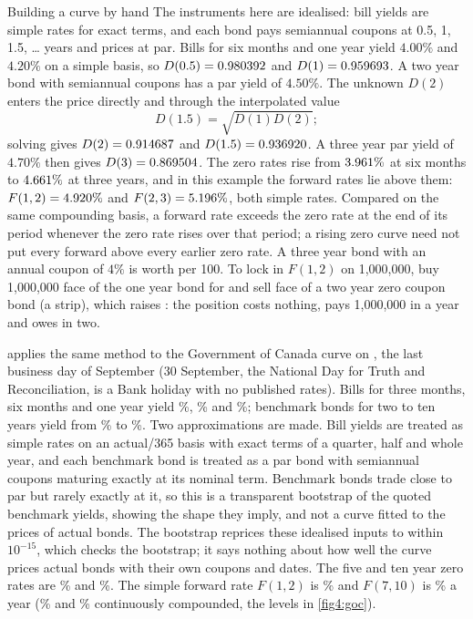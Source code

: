 \begin{chapterrefs}
\begin{example}{Building a curve by hand}\label{ex4:boot}
The instruments here are idealised: bill yields are simple rates for exact terms, and each bond pays
semiannual coupons at 0.5, 1, 1.5, \ldots{} years and prices at par. Bills for six months and one year yield $4.00\%$ and $4.20\%$ on a simple basis, so $D(0.5)=0.980392$
and $D(1)=0.959693$. A two year bond with semiannual coupons has a par yield of $4.50\%$. The unknown
$D(2)$ enters the price directly and through the interpolated value
\[
  D(1.5)=\sqrt{D(1)D(2)};
\]
solving gives
$D(2)=0.914687$ and $D(1.5)=0.936920$. A three year par yield of $4.70\%$ then gives
$D(3)=0.869504$. The zero rates rise from $3.961\%$ at six months to $4.661\%$ at three
years, and in this example the forward rates lie above them: $F(1,2)=4.920\%$ and
$F(2,3)=5.196\%$, both simple rates. Compared on the same compounding basis, a forward rate
exceeds the zero rate at the end of its period whenever the zero rate rises over that period; a rising
zero curve need not put every forward above every earlier zero rate. A three year bond with an annual coupon of
$4\%$ is worth \hxBondFour{} per 100. To lock in $F(1,2)$ on 1,000,000, buy 1,000,000 face of the
one year bond for \fraBuy{} and sell \fraRepay{} face of a two year zero coupon bond (a strip), which raises \fraSell:
the position costs nothing, pays 1,000,000 in a year and owes \fraRepay{} in two.
\end{example}

 applies the same method to the Government of Canada curve on \gocDate, the last
business day of September (30 September, the National Day for Truth and Reconciliation, is a Bank
holiday with no published rates). Bills for three
months, six months and one year yield \gocThreeM\%, \gocSixM\% and \gocOneY\%; benchmark bonds for two
to ten years yield from \gocTwoY\% to \gocTenY\%. Two approximations are made. Bill yields are treated
as simple rates on an actual/365 basis with exact terms of a quarter, half and whole year, and each
benchmark bond is treated as a par bond with semiannual coupons maturing exactly at its nominal term.
Benchmark bonds trade close to par but rarely exactly at it, so this is a transparent bootstrap of
the quoted benchmark yields, showing the shape they imply, and not a curve fitted to the prices of
actual bonds. The bootstrap reprices these idealised inputs to within $10^{-15}$, which checks
the bootstrap; it says nothing about how well the curve prices actual bonds with their own coupons and
dates. The five and ten year zero rates are \gocZeroFive\% and \gocZeroTen\%. The simple forward rate
$F(1,2)$ is \gocFwdOneTwo\% and $F(7,10)$ is \gocFwdSevenTen\% a year (\gocFwdOneTwoCont\% and
\gocFwdSevenTenCont\% continuously compounded, the levels in \cref{fig4:goc}).


\end{chapterrefs}
